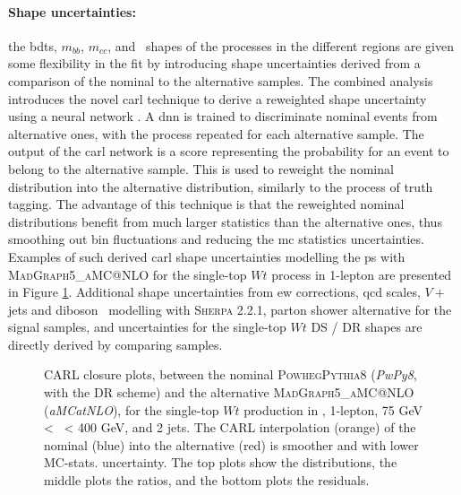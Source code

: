 \paragraph{Shape uncertainties:} the \gls{bdt}s, $m_{bb}$, $m_{cc}$, and \ptv\ shapes of the processes in the different regions are given some flexibility in the fit by introducing shape uncertainties derived from a comparison of the nominal to the alternative samples. The combined analysis introduces the novel \gls{carl} technique to derive a reweighted shape uncertainty using a neural network \cite{carl}. A \gls{dnn} is trained to discriminate nominal events from alternative ones, with the process repeated for each alternative sample. The output of the \gls{carl} network is a score representing the probability for an event to belong to the alternative sample. This is used to reweight the nominal distribution into the alternative distribution, similarly to the process of truth tagging. The advantage of this technique is that the reweighted nominal distributions benefit from much larger statistics than the alternative ones, thus smoothing out bin fluctuations and reducing the \gls{mc} statistics uncertainties. Examples of such derived \gls{carl} shape uncertainties modelling the \gls{ps} with \textsc{MadGraph5\_aMC@NLO} for the single-top $Wt$ process in 1-lepton are presented in Figure \ref{fig:carl:resolved_closure_stopWt}. Additional shape uncertainties from \gls{ew} corrections, \gls{qcd} scales, $V+$jets and diboson \ptv\ modelling with \textsc{Sherpa} 2.2.1, parton shower alternative for the signal samples, and uncertainties for the single-top $Wt$ DS / DR shapes are directly derived by comparing samples.

\begin{figure}[!htbp]
    \centering
      \caption{CARL closure plots, between the nominal \textsc{Powheg}\textsc{Pythia}8 (\textit{PwPy8}, with the DR scheme) and the alternative \textsc{MadGraph5\_aMC@NLO} (\textit{aMCatNLO}), for the single-top $Wt$ production in \vhb, 1-lepton, 75 GeV < \ptv\ < 400 GeV, and 2 jets. The CARL interpolation (orange) of the nominal (blue) into the alternative (red) is smoother and with lower MC-stats. uncertainty. The top plots show the distributions, the middle plots the ratios, and the bottom plots the residuals.}
      \label{fig:carl:resolved_closure_stopWt}
  \end{figure}
  
